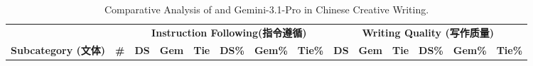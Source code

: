 \begin{table}[t]
\begin{tabular}{ll r | rrr rrr}
\bottomrule
\end{tabular}
\end{table}


\begin{table}[t]
\centering
\caption{
Comparative Analysis of \dsvivp{} and Gemini-3.1-Pro in Chinese Creative Writing.}
\label{tab:creative_writing}
\footnotesize
\setlength{\tabcolsep}{2.5pt}
\begin{tabular}{l r | rrr rrr | rrr rrr}
\toprule
& & \multicolumn{6}{c|}{\textbf{Instruction Following(指令遵循)}}
  & \multicolumn{6}{c}{\textbf{Writing Quality (写作质量)}} \\
\cmidrule(lr){3-8} \cmidrule(lr){9-14}
\textbf{Subcategory (文体)} & \textbf{\#}
  & \textbf{DS} & \textbf{Gem} & \textbf{Tie}
  & \textbf{DS\%} & \textbf{Gem\%} & \textbf{Tie\%}
  & \textbf{DS} & \textbf{Gem} & \textbf{Tie}
  & \textbf{DS\%} & \textbf{Gem\%} & \textbf{Tie\%} \\
\midrule


\end{tabular}
\end{table}

